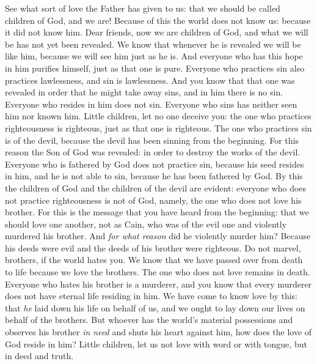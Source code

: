 \begin{biblechapter} %
\verse See what sort of love the Father has given to us: that we should be called children of God, and we are! Because of this the world does not know us: because it did not know him.
\verse Dear friends, now we are children of God, and what we will be has not yet been revealed. We know that whenever he is revealed we will be like him, because we will see him just as he is.
\verse And everyone who has this hope in him purifies himself, just as that one is pure.
\verse Everyone who practices sin also practices lawlessness, and sin is lawlessness.
\verse And you know that that one was revealed in order that he might take away sins, and in him there is no sin.
\verse Everyone who resides in him does not sin. Everyone who sins has neither seen him nor known him.
\verse Little children, let no one deceive you: the one who practices righteousness is righteous, just as that one is righteous.
\verse The one who practices sin is of the devil, because the devil has been sinning from the beginning. For this reason the Son of God was revealed: in order to destroy the works of the devil.
\verse Everyone who is fathered by God does not practice sin, because his seed resides in him, and he is not able to sin, because he has been fathered by God.
\verse By this the children of God and the children of the devil are evident: everyone who does not practice righteousness is not of God, namely, the one who does not love his brother.
 For this is the message that you have heard from the beginning: that we should love one another,
\verse not as Cain, who was of the evil one and violently murdered his brother. And \textit{for what reason} did he violently murder him? Because his deeds were evil and the deeds of his brother were righteous.
\verse Do not marvel, brothers, if the world hates you.
\verse We know that we have passed over from death to life because we love the brothers. The one who does not love remains in death.
\verse Everyone who hates his brother is a murderer, and you know that every murderer does not have eternal life residing in him.
\verse We have come to know love by this: that \textit{he} laid down his life on behalf of us, and we ought to lay down our lives on behalf of the brothers.
\verse But whoever has the world’s material possessions and observes his brother \textit{in need} and shuts his heart against him, how does the love of God reside in him?
\verse Little children, let us not love with word or with tongue, but in deed and truth.

\end{biblechapter}
